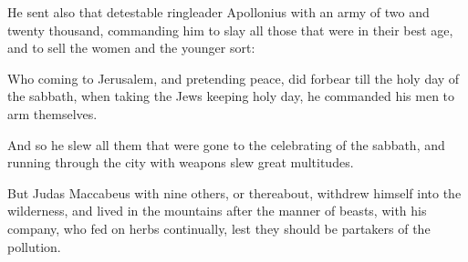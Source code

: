{\par }{\PP {}He sent also that detestable ringleader Apollonius with an army of two and twenty thousand, commanding him to slay all those that were in their best age, and to sell the women and the younger sort:
\par }{\PP {}Who coming to Jerusalem, and pretending peace, did forbear till the holy day of the sabbath, when taking the Jews keeping holy day, he commanded his men to arm themselves.
\par }{\PP {}And so he slew all them that were gone to the celebrating of the sabbath, and running through the city with weapons slew great multitudes.
\par }{\PP {}But Judas Maccabeus with nine others, or thereabout, withdrew himself into the wilderness, and lived in the mountains after the manner of beasts, with his company, who fed on herbs continually, lest they should be partakers of the pollution.

}
